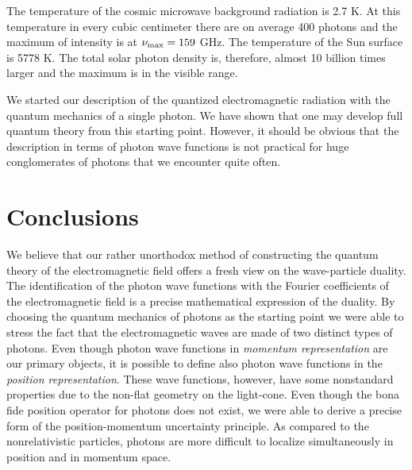 \documentclass[twocolumn,aps,pra,10pt]{revtex4-1}
\begin{document}
The temperature of the cosmic microwave background radiation is 2.7 K. At this temperature in every cubic centimeter there are on average 400 photons and the maximum of intensity is at $\nu_{\rm max}=159$ GHz. The temperature of the Sun surface is 5778 K. The total solar photon density is, therefore, almost 10 billion times larger and the maximum is in the visible range.

We started our description of the quantized electromagnetic radiation with the quantum mechanics of a single photon. We have shown that one may develop full quantum theory from this starting point. However, it should be obvious that the description in terms of photon wave functions is not practical for huge conglomerates of photons that we encounter quite often.

\section{Conclusions}

We believe that our rather unorthodox method of constructing the quantum theory of the electromagnetic field offers a fresh view on the wave-particle duality. The identification of the photon wave functions with the Fourier coefficients of the electromagnetic field is a precise mathematical expression of the duality. By choosing the quantum mechanics of photons as the starting point we were able to stress the fact that the electromagnetic waves are made of two distinct types of photons. Even though photon wave functions in {\em momentum representation} are our primary objects, it is possible to define also photon wave functions in the {\em position representation}. These wave functions, however, have some nonstandard properties due to the non-flat geometry on the light-cone. Even though the bona fide position operator for photons does not exist, we were able to derive a precise form of the position-momentum uncertainty principle. As compared to the nonrelativistic particles, photons are more difficult to localize simultaneously in position and in momentum space.
\end{document}
